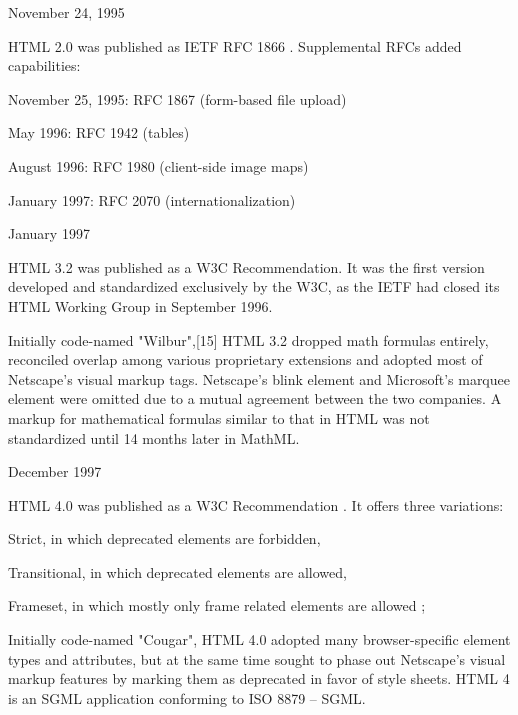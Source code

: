 \begin{compactitem}
\item November 24, 1995

HTML 2.0 was published as IETF RFC 1866 . Supplemental RFCs added capabilities:

	\begin{compactitem}
	\item November 25, 1995: RFC 1867 (form-based file upload)
	\item May 1996: RFC 1942 (tables)
	\item August 1996: RFC 1980 (client-side image maps)
	\item January 1997: RFC 2070 (internationalization)
	\end{compactitem}
	
\item January 1997

HTML 3.2 was published as a W3C Recommendation. It was the first version developed and standardized exclusively by the W3C, as the IETF had closed its HTML Working Group in September 1996.

Initially code-named "Wilbur",[15] HTML 3.2 dropped math formulas entirely, reconciled overlap among various proprietary extensions and adopted most of Netscape's visual markup tags. Netscape's blink element and Microsoft's marquee element were omitted due to a mutual agreement between the two companies. A markup for mathematical formulas similar to that in HTML was not standardized until 14 months later in MathML.

\item December 1997

HTML 4.0 was published as a W3C Recommendation . It offers three variations:

	\begin{compactitem}
	\item Strict, in which deprecated elements are forbidden,
	\item Transitional, in which deprecated elements are allowed,
	\item Frameset, in which mostly only frame related elements are allowed ;
	\end{compactitem}
	
Initially code-named "Cougar", HTML 4.0 adopted many browser-specific element types and attributes, but at the same time sought to phase out Netscape's visual markup features by marking them as deprecated in favor of style sheets. HTML 4 is an SGML application conforming to ISO 8879 – SGML.


\end{compactitem}
